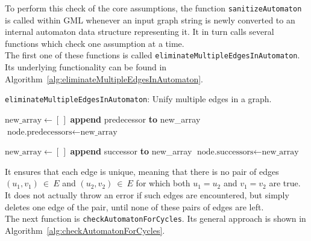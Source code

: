 \documentclass[a4paper,12pt,twoside,BCOR=10mm]{scrbook}
\begin{document}
To perform this check of the core assumptions, the function \texttt{sanitizeAutomaton} is called within GML
whenever an input graph string is newly converted to an internal automaton data structure representing it.
It in turn calls several functions which check one assumption at a time. \\
The first one of these functions is called \texttt{eliminateMultipleEdgesInAutomaton}.
Its underlying functionality can be found in Algorithm~\ref{alg:eliminateMultipleEdgesInAutomaton}.
\begin{algorithm}
\caption[\texttt{eliminateMultipleEdgesInAutomaton}: Unify multiple edges in a graph]{\texttt{eliminateMultipleEdgesInAutomaton}: Unify multiple edges in a graph.}
\label{alg:eliminateMultipleEdgesInAutomaton}
\begin{algorithmic}[1]
		\State $ \textrm{new\_array} \gets [ \, ] $
				\State \textbf{append} predecessor \textbf{to} new\_array
			\EndIf
		\EndFor
		\State $ \textrm{node.predecessors} \gets \textrm{new\_array} $
	\EndIf

		\State $ \textrm{new\_array} \gets [ \, ] $
				\State \textbf{append} successor \textbf{to} new\_array
			\EndIf
		\EndFor
		\State $ \textrm{node.successors} \gets \textrm{new\_array} $
	\EndIf
\EndFor
\end{algorithmic}
\end{algorithm}
It ensures that each edge is unique, meaning that there is no pair of
edges $ (u_1, v_1) {\: \in \:} E $ and $ (u_2, v_2) {\: \in \:} E $ for which both $ u_1 = u_2 $ and $ v_1 = v_2 $ are true.
It does not actually throw an error if such edges are encountered, but simply deletes one edge of the pair, until none
of these pairs of edges are left. \\
The next function is \texttt{checkAutomatonForCycles}.
Its general approach is shown in Algorithm~\ref{alg:checkAutomatonForCycles}.
\end{document}
